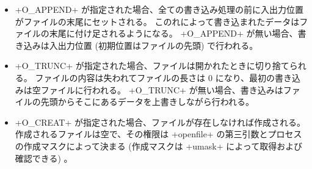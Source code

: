 \begin{itemize}
\item \ml+O_APPEND+ が指定された場合、全ての書き込み処理の前に入出力位置がファイルの末尾にセットされる。
  このれによって書き込まれたデータはファイルの末尾に付け足されるようになる。
  \ml+O_APPEND+ が無い場合、書き込みは入出力位置 (初期位置はファイルの先頭) で行われる。

\item \ml+O_TRUNC+ が指定された場合、ファイルは開かれたときに切り捨てられる。
  ファイルの内容は失われてファイルの長さは 0 になり、最初の書き込みは空ファイルに行われる。
  \ml+O_TRUNC+ が無い場合、書き込みはファイルの先頭からそこにあるデータを上書きしながら行われる。

\item \ml+O_CREAT+ が指定された場合、ファイルが存在しなければ作成される。
  作成されるファイルは空で、その権限は \ml+openfile+ の第三引数とプロセスの作成マスクによって決まる
  (作成マスクは \ml+umask+ によって取得および確認できる) 。


\end{itemize}
